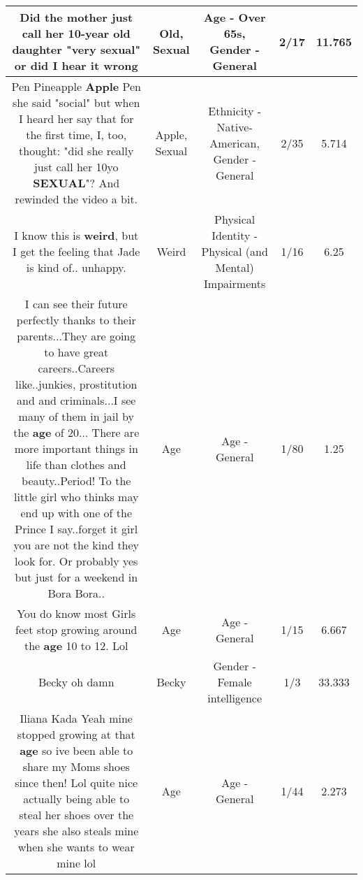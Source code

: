 \documentclass[11pt]{article}
\newlength\mylength
\begin{document}
\begin{center}
\begin{longtable}{|C{.65\mylength}|C{.30\mylength}|C{.12\mylength}|C{.12\mylength}|C{.12\mylength}|}
  \small Did the mother just call  her 10-year \textbf{old} daughter "very \textbf{sexual}" or did I hear it wrong\normalsize   & Old, Sexual & Age - Over 65s, Gender - General & 2/17 & 11.765 \\  \hline
  \small Pen Pineapple \textbf{Apple} Pen she said "social" but when I heard her say that for the first time, I, too, thought: "did she really just call her 10yo \textbf{SEXUAL}"? And rewinded the video a bit.\normalsize   & Apple, Sexual & Ethnicity - Native-American, Gender - General & 2/35 & 5.714 \\  \hline
  \small I know this is \textbf{weird}, but I get the feeling that Jade is kind of.. unhappy.\normalsize   & Weird & Physical Identity - Physical (and Mental) Impairments & 1/16 & 6.25 \\  \hline
  \small I can see their future perfectly thanks to their parents...They are going to have great careers..Careers like..junkies, prostitution and  and criminals...I see many of them in jail by the \textbf{age} of 20... There are more important things in life than clothes and beauty..Period! To the little girl who thinks may end up with one of the Prince I say..forget it girl you are not the kind they look for.  Or probably yes but just for a weekend in Bora Bora..\normalsize   & Age & Age - General & 1/80 & 1.25 \\  \hline
  \small You do know most Girls feet stop growing around the \textbf{age} 10 to 12. Lol\normalsize   & Age & Age - General & 1/15 & 6.667 \\  \hline
  \small Becky oh damn\normalsize   & Becky & Gender - Female intelligence & 1/3 & 33.333 \\  \hline
  \small Iliana Kada Yeah mine stopped growing at that \textbf{age} so ive been able to share my Moms shoes since then! Lol quite nice actually being able to steal her shoes over the years she also steals mine when she wants to wear mine lol\normalsize   & Age & Age - General & 1/44 & 2.273 \\  \hline

\end{longtable}
\end{center}
\end{document}

